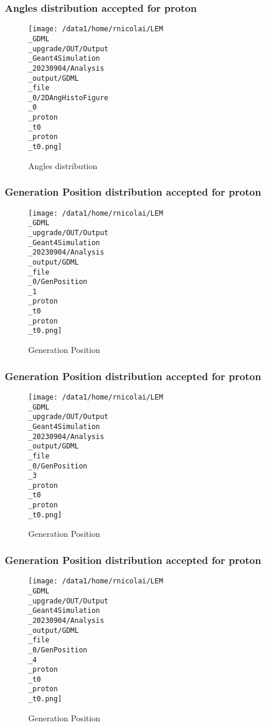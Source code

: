 \documentclass[8pt]{beamer}
\begin{document}
            \begin{frame}
                \frametitle{Angles distribution accepted for proton}
            
        \begin{figure}[h]
            \centering
            \texttt{[image: /data1/home/rnicolai/LEM\\\_GDML\\\_upgrade/OUT/Output\\\_Geant4Simulation\\\_20230904/Analysis\\\_output/GDML\\\_file\\\_0/2DAngHistoFigure\\\_0\\\_proton\\\_t0\\\_proton\\\_t0.png]}
            \caption{Angles distribution}
        \end{figure}
        
            \end{frame}
            
            \begin{frame}
                \frametitle{Generation Position distribution accepted for proton}
            
        \begin{figure}[h]
            \centering
            \texttt{[image: /data1/home/rnicolai/LEM\\\_GDML\\\_upgrade/OUT/Output\\\_Geant4Simulation\\\_20230904/Analysis\\\_output/GDML\\\_file\\\_0/GenPosition\\\_1\\\_proton\\\_t0\\\_proton\\\_t0.png]}
            \caption{Generation Position}
        \end{figure}
        
            \end{frame}
            
            \begin{frame}
                \frametitle{Generation Position distribution accepted for proton}
            
        \begin{figure}[h]
            \centering
            \texttt{[image: /data1/home/rnicolai/LEM\\\_GDML\\\_upgrade/OUT/Output\\\_Geant4Simulation\\\_20230904/Analysis\\\_output/GDML\\\_file\\\_0/GenPosition\\\_3\\\_proton\\\_t0\\\_proton\\\_t0.png]}
            \caption{Generation Position}
        \end{figure}
        
            \end{frame}
            
            \begin{frame}
                \frametitle{Generation Position distribution accepted for proton}
            
        \begin{figure}[h]
            \centering
            \texttt{[image: /data1/home/rnicolai/LEM\\\_GDML\\\_upgrade/OUT/Output\\\_Geant4Simulation\\\_20230904/Analysis\\\_output/GDML\\\_file\\\_0/GenPosition\\\_4\\\_proton\\\_t0\\\_proton\\\_t0.png]}
            \caption{Generation Position}
        \end{figure}
        
            \end{frame}
            
\end{document}
